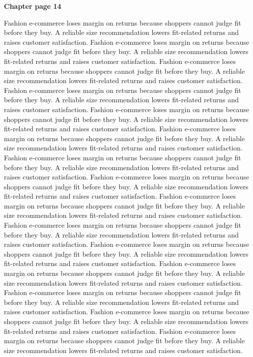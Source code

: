 \documentclass[a4paper,11pt]{article}
\begin{document}
{\headfont\bfseries\Large Chapter page 14}\par\medskip
Fashion e-commerce loses margin on returns because shoppers cannot judge fit before they buy. A reliable size recommendation lowers fit-related returns and raises customer satisfaction. Fashion e-commerce loses margin on returns because shoppers cannot judge fit before they buy. A reliable size recommendation lowers fit-related returns and raises customer satisfaction. Fashion e-commerce loses margin on returns because shoppers cannot judge fit before they buy. A reliable size recommendation lowers fit-related returns and raises customer satisfaction. Fashion e-commerce loses margin on returns because shoppers cannot judge fit before they buy. A reliable size recommendation lowers fit-related returns and raises customer satisfaction. Fashion e-commerce loses margin on returns because shoppers cannot judge fit before they buy. A reliable size recommendation lowers fit-related returns and raises customer satisfaction. 
Fashion e-commerce loses margin on returns because shoppers cannot judge fit before they buy. A reliable size recommendation lowers fit-related returns and raises customer satisfaction. Fashion e-commerce loses margin on returns because shoppers cannot judge fit before they buy. A reliable size recommendation lowers fit-related returns and raises customer satisfaction. Fashion e-commerce loses margin on returns because shoppers cannot judge fit before they buy. A reliable size recommendation lowers fit-related returns and raises customer satisfaction. Fashion e-commerce loses margin on returns because shoppers cannot judge fit before they buy. A reliable size recommendation lowers fit-related returns and raises customer satisfaction. Fashion e-commerce loses margin on returns because shoppers cannot judge fit before they buy. A reliable size recommendation lowers fit-related returns and raises customer satisfaction. 
Fashion e-commerce loses margin on returns because shoppers cannot judge fit before they buy. A reliable size recommendation lowers fit-related returns and raises customer satisfaction. Fashion e-commerce loses margin on returns because shoppers cannot judge fit before they buy. A reliable size recommendation lowers fit-related returns and raises customer satisfaction. Fashion e-commerce loses margin on returns because shoppers cannot judge fit before they buy. A reliable size recommendation lowers fit-related returns and raises customer satisfaction. Fashion e-commerce loses margin on returns because shoppers cannot judge fit before they buy. A reliable size recommendation lowers fit-related returns and raises customer satisfaction. Fashion e-commerce loses margin on returns because shoppers cannot judge fit before they buy. A reliable size recommendation lowers fit-related returns and raises customer satisfaction. \newpage
\end{document}
